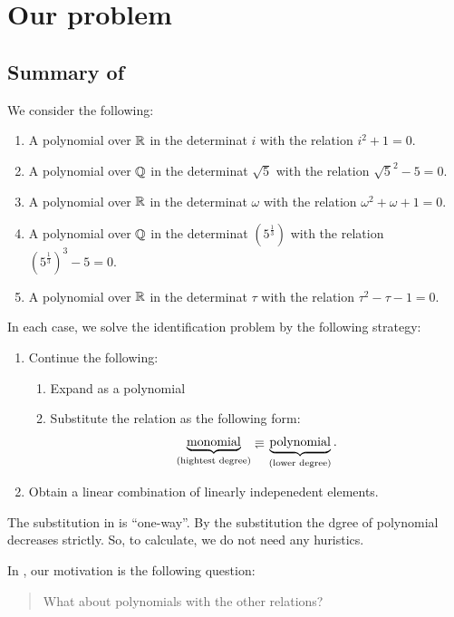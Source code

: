 \chapter{Our problem}
\label{chap:ourproblem}
\section{Summary of }
We consider the following:
\begin{enumerate}
\item
  A polynomial over $\mathbb{R}$ in the determinat $i$
  with the relation $i^2+1=0$.
\item
  A polynomial over $\mathbb{Q}$ in the determinat $\sqrt{5}$
  with the relation $\sqrt{5}^2-5=0$.
\item
  A polynomial over $\mathbb{R}$ in the determinat $\omega$
  with the relation $\omega^2+\omega+1=0$.
\item
  A polynomial over $\mathbb{Q}$ in the determinat $\left(5^{\frac{1}{3}}\right)$
  with the relation $\left(5^{\frac{1}{3}}\right)^3-5=0$.
\item
  A polynomial over $\mathbb{R}$ in the determinat $\tau$
  with the relation $\tau^2-\tau-1=0$.
\end{enumerate}
In each case,
we solve the identification problem by the following strategy:
\begin{enumerate}
\item Continue the following:
  \begin{enumerate}
  \item Expand as a polynomial
  \item
    \label{basicstrategy:item:subs}
    Substitute the relation as the following form:
    \begin{align*}
      \underbrace{\text{monomial}}_{\text{(hightest degree)}}\denotes \underbrace{\text{polynomial}}_{\text{(lower degree)}}.
    \end{align*}
  \end{enumerate}
\item Obtain  a linear combination of linearly indepenedent elements.
\end{enumerate}

\begin{remark}
  The substitution in 
  is ``one-way''.
  By the substitution the dgree of polynomial decreases strictly.
  So, to calculate,
  we do not need any huristics.
\end{remark}

In ,
our motivation is the following question:
\begin{quotation}
  What about polynomials with the other relations?
\end{quotation}


